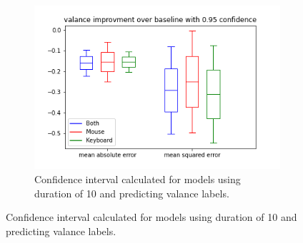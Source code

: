 \documentclass[../main.tex]{subfiles}
\begin{document}
\begin{figure}[!h]
\begin{subfigure}[b]{0.31\textwidth}
        \centering
        \includegraphics[width=\textwidth]{figures/results/interval_difference/10/10_valance_0.95.png}
        \captionsetup{justification=centering}
        \caption{Confidence interval calculated for models using duration of 10 and predicting valance labels.}
    \end{subfigure}



\end{figure}
\end{document}
